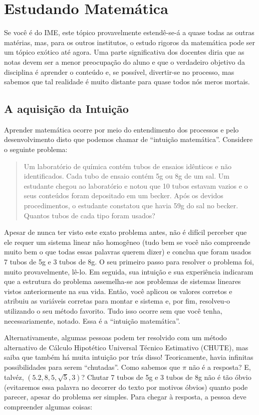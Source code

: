 \documentclass[
  letterpaper,
  DIV=11,
  numbers=noendperiod]{scrreprt}
\begin{document}
\section{Estudando Matemática}\label{estudando-matemuxe1tica}

Se você é do IME, este tópico provavelmente estendê-se-á a quase todas
as outras matérias, mas, para os outros institutos, o estudo rigoros da
matemática pode ser um tópico exótico até agora. Uma parte significativa
dos docentes diria que as notas devem ser a menor preocupação do aluno e
que o verdadeiro objetivo da disciplina é aprender o conteúdo e, se
possível, divertir-se no processo, mas sabemos que tal realidade é muito
distante para quase todos nós meros mortais.

\subsection{A aquisição da
Intuição}\label{a-aquisiuxe7uxe3o-da-intuiuxe7uxe3o}

Aprender matemática ocorre por meio do entendimento dos processos e pelo
desenvolvimento disto que podemos chamar de ``intuição matemática''.
Considere o seguinte problema:

\begin{quote}
Um laboratório de química contém tubos de ensaios idênticos e não
identificados. Cada tubo de ensaio contém 5g ou 8g de um sal. Um
estudante chegou ao laboratório e notou que 10 tubos estavam vazios e o
seus conteúdos foram depositado em um becker. Após os devidos
procedimentos, o estudante constatou que havia 59g do sal no becker.
Quantos tubos de cada tipo foram usados?
\end{quote}

Apesar de nunca ter visto este exato problema antes, não é difícil
perceber que ele requer um sistema linear não homogêneo (tudo bem se
você não compreende muito bem o que todas essas palavras querem dizer) e
conclua que foram usados 7 tubos de 5g e 3 tubos de 8g. O seu primeiro
passo para resolver o problema foi, muito provavelmente, lê-lo. Em
seguida, sua intuição e sua experiência indicaram que a estrutura do
problema assemelha-se aos problemas de sistemas lineares vistos
anteriormente na sua vida. Então, você aplicou os valores corretos e
atribuiu as variáveis corretas para montar e sistema e, por fim,
resolveu-o utilizando o seu método favorito. Tudo isso ocorre sem que
você tenha, necessariamente, notado. Essa é a ``intuição matemática''.

Alternativamente, algumas pessoas podem ter resolvido com um método
alternativo de Cálculo Hipotético Universal Técnico Estimativo (CHUTE),
mas saiba que também há muita intuição por trás disso! Teoricamente,
havia infinitas possibilidades para serem ``chutadas''. Como sabemos que
\(\pi\) não é a resposta? E, talvéz, \((5.2, 8,5, \sqrt{5}, 3)\)? Chutar
7 tubos de 5g e 3 tubos de 8g não é tão óbvio (evitaremos essa palavra
no decorrer do texto por motivos óbvios) quanto pode parecer, apesar do
problema ser simples. Para chegar à resposta, a pessoa deve compreender
algumas coisas:
\end{document}
